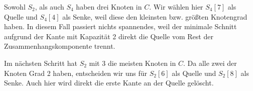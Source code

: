 \begin{center}
\end{center}

Sowohl $S_2$, als auch $S_4$ haben drei Knoten in $C$. Wir wählen hier $S_4[7]$ als Quelle und $S_4[4]$ als Senke, weil diese den kleinsten bzw. größten Knotengrad haben. In diesem Fall passiert nichts spannendes, weil der minimale Schnitt aufgrund der Kante mit Kapazität 2 direkt die Quelle vom Rest der Zusammenhangskomponente trennt.

Im nächsten Schritt hat $S_2$ mit 3 die meisten Knoten in $C$. Da alle zwei der Knoten Grad 2 haben, entscheiden wir uns für $S_2[6]$ als Quelle und $S_2[8]$ als Senke. Auch hier wird direkt die erste Kante an der Quelle gelöscht.

